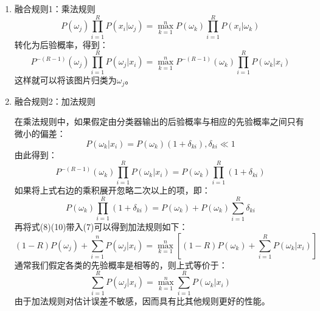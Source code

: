 \begin{enumerate}
\item 融合规则1：乘法规则
    \begin{equation}
    P(\omega_{j})\prod^{R}_{i=1}P(x_{i}|\omega_{j})=\max^{n}_{k=1}P(\omega_{k})\prod^{R}_{i=1}P(x_{i}|\omega_{k})
    \end{equation}
    转化为后验概率，得到：
    \begin{equation}
    P^{-(R-1)}(\omega_{j})\prod^{R}_{i=1}P(\omega_{j}|x_{i})=\max^{n}_{k=1}P^{-(R-1)}(\omega_{k})\prod^{R}_{i=1}P(\omega_{k}|x_{i})
    \end{equation}
    这样就可以将该图片归类为$\omega_{j}$。
\item 融合规则2：加法规则

    在乘法规则中，如果假定由分类器输出的后验概率与相应的先验概率之间只有微小的偏差：
    \begin{equation}
    P(\omega_{k}|x_{i})=P(\omega_{k})(1+\delta_{ki}), \delta_{ki}\ll1
    \end{equation}
    由此得到：
    \begin{equation}
    P^{-(R-1)}(\omega_{k})\prod^{R}_{i=1}P(\omega_{k}|x_{i})=P(\omega_{k})\prod^{R}_{i=1}(1+\delta_{ki})
    \end{equation}
    如果将上式右边的乘积展开忽略二次以上的项，即：
    \begin{equation}
    P(\omega_{k})\prod^{R}_{i=1}(1+\delta_{ki})=P(\omega_{k})+P(\omega_{k})\sum^{R}_{i=1}\delta_{ki}
    \end{equation}
    再将式(8)(10)带入(7)可以得到加法规则如下：
    \begin{equation}
    (1-R)P(\omega_{j})+\sum^{n}_{i=1}P(\omega_{j}|x_{i})=\max^{n}_{k=1}[(1-R)P(\omega_{k})+\sum^{R}_{i=1}P(\omega_{k}|x_{i})]
    \end{equation}
    通常我们假定各类的先验概率是相等的，则上式等价于：
    \begin{equation}
    \sum^{R}_{i=1}P(\omega_{j}|x_{i})=\max^{n}_{k=1}\sum^{R}_{i=1}P(\omega_{k}|x_{i})
    \end{equation}
    由于加法规则对估计误差不敏感，因而具有比其他规则更好的性能。
\end{enumerate}


\begin{comment}
\begin{itemize}
\item 基于灰度共生矩阵的方法
\item 灰度-梯度共生矩阵分析法
\item 灰度行程长度统计法
\item 小波分析法
\item 基于Gabor小波变换的纹理分析法
\end{itemize}
\end{comment}